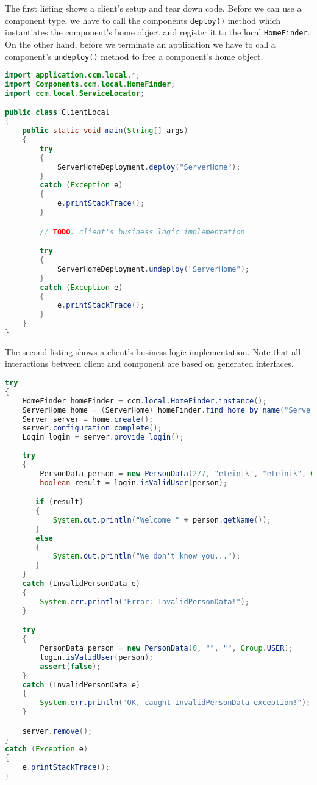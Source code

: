 The first listing shows a client's setup and tear down code. Before we can use
a component type, we have to call the components {\tt deploy()} method which
instantiates the component's home object and register it to the local {\tt HomeFinder}.
On the other hand, before we terminate an application we have to call a
component's {\tt undeploy()} method to free a component's home object. 
	
\begin{footnotesize}
\begin{lstlisting}[language=Java]
import application.ccm.local.*;
import Components.ccm.local.HomeFinder;
import ccm.local.ServiceLocator;

public class ClientLocal
{
    public static void main(String[] args)
    {
        try
        {
            ServerHomeDeployment.deploy("ServerHome");
        }
        catch (Exception e)
        {
            e.printStackTrace();
        }

        // TODO: client's business logic implementation

        try
        {
            ServerHomeDeployment.undeploy("ServerHome");
        }
        catch (Exception e)
        {
            e.printStackTrace();
        }
    }
}
\end{lstlisting}
\end{footnotesize}

The second listing shows a client's business logic implementation. Note that all
interactions between client and component are based on generated interfaces.

\begin{footnotesize}
\begin{lstlisting}[language=Java]
try
{            
    HomeFinder homeFinder = ccm.local.HomeFinder.instance();
    ServerHome home = (ServerHome) homeFinder.find_home_by_name("ServerHome");
    Server server = home.create();
    server.configuration_complete();
    Login login = server.provide_login();
                        
    try
    {
        PersonData person = new PersonData(277, "eteinik", "eteinik", Group.USER);
        boolean result = login.isValidUser(person);

       if (result)
       {
           System.out.println("Welcome " + person.getName());
       }
       else
       {
           System.out.println("We don't know you...");
       }
    }
    catch (InvalidPersonData e)
    {
        System.err.println("Error: InvalidPersonData!");
    }

    try
    {
        PersonData person = new PersonData(0, "", "", Group.USER);
        login.isValidUser(person);
        assert(false);
    }
    catch (InvalidPersonData e)
    {
        System.err.println("OK, caught InvalidPersonData exception!");
    }

    server.remove();
}
catch (Exception e)
{
    e.printStackTrace();
}
\end{lstlisting}
\end{footnotesize}

